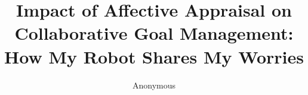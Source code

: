 \documentclass[conference]{IEEEtran}
\begin{document}
%

\title{{\fontsize{19}{20}\selectfont Impact of Affective Appraisal on
Collaborative Goal Management:\\How My Robot Shares My Worries}}



\author{Anonymous}


% 
\end{document}
